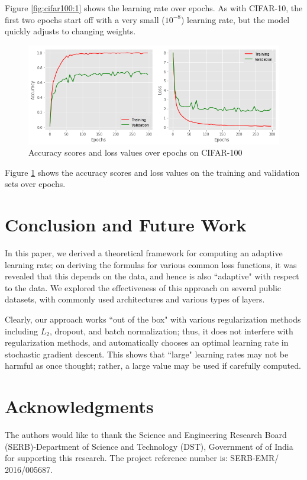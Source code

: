 \documentclass{article}
\begin{document}
Figure \ref{fig:cifar100:1} shows the learning rate over epochs. As with CIFAR-10, the first two epochs start off with a very small ($10^{-8}$) learning rate, but the model quickly adjusts to changing weights.

\begin{figure}
    \centering
    \includegraphics[scale=0.4]{plot-rn162.png}
    \caption{Accuracy scores and loss values over epochs on CIFAR-100}
    \label{fig:cifar100:2}
\end{figure}

Figure \ref{fig:cifar100:2} shows the accuracy scores and loss values on the training and validation sets over epochs.

\section{Conclusion and Future Work}
In this paper, we derived a theoretical framework for computing an adaptive learning rate; on deriving the formulas for various common loss functions, it was revealed that this depends on the data, and hence is also ``adaptive" with respect to the data. We explored the effectiveness of this approach on several public datasets, with commonly used architectures and various types of layers.

Clearly, our approach works ``out of the box" with various regularization methods including $L_2$, dropout, and batch normalization; thus, it does not interfere with regularization methods, and automatically chooses an optimal learning rate in stochastic gradient descent. This shows that ``large" learning rates may not be harmful as once thought; rather, a large value may be used if carefully computed.


\section*{Acknowledgments}
The authors would like to thank the Science and Engineering Research
Board (SERB)-Department of Science and Technology
(DST), Government of of India for supporting this research.
The project reference number is: SERB-EMR/ 2016/005687.
\vskip 0.2in
\end{document}
